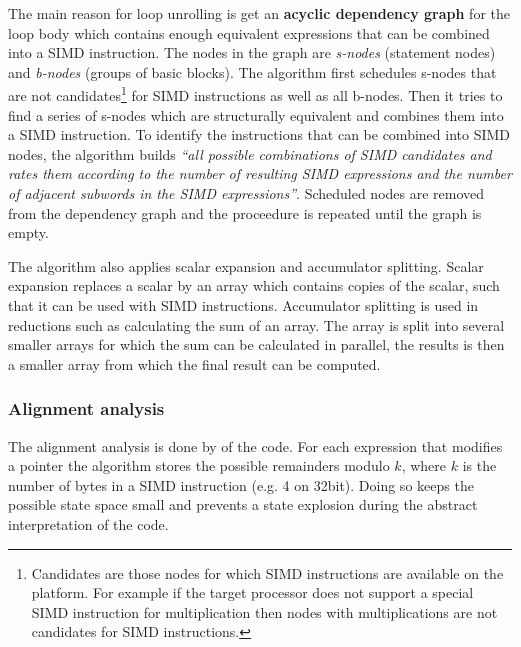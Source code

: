 \documentclass[a4paper,10pt]{article}
\begin{document}
The main reason for loop unrolling is get an \textbf{acyclic dependency graph} for the loop body which contains enough equivalent
expressions that can be combined into a SIMD instruction. The nodes in the graph are \textit{s-nodes} (statement nodes) and
\textit{b-nodes} (groups of basic blocks). The algorithm first schedules s-nodes that are not candidates\footnote{Candidates are
those nodes for which SIMD instructions are available on the platform. For example if the target processor does not support a special
SIMD instruction for multiplication then nodes with multiplications are not candidates for SIMD instructions.} for SIMD instructions
as well as all b-nodes. Then it tries to find a series of s-nodes which are structurally equivalent and combines them into a SIMD
instruction. To identify the instructions that can be combined into SIMD nodes, the algorithm builds \textit{``all possible
combinations of SIMD candidates and rates them according to the number of resulting SIMD expressions and the number
of adjacent subwords in the SIMD expressions''}. Scheduled nodes are removed from the dependency graph and the proceedure is repeated
until the graph is empty.

The algorithm also applies scalar expansion and accumulator splitting. Scalar expansion replaces a scalar by an array which
contains copies of the scalar, such that it can be used with SIMD instructions. Accumulator splitting is used in reductions such as
calculating the sum of an array. The array is split into several smaller arrays for which the sum can be calculated in parallel, the
results is then a smaller array from which the final result can be computed.

\subsubsection{Alignment analysis}
The alignment analysis is done by  of the code. For each expression that modifies a pointer the
algorithm stores the possible remainders modulo $k$, where $k$ is the number of bytes in a SIMD instruction (e.g. 4 on 32bit). Doing
so keeps the possible state space small and prevents a state explosion during the abstract interpretation of the code.
\end{document}
